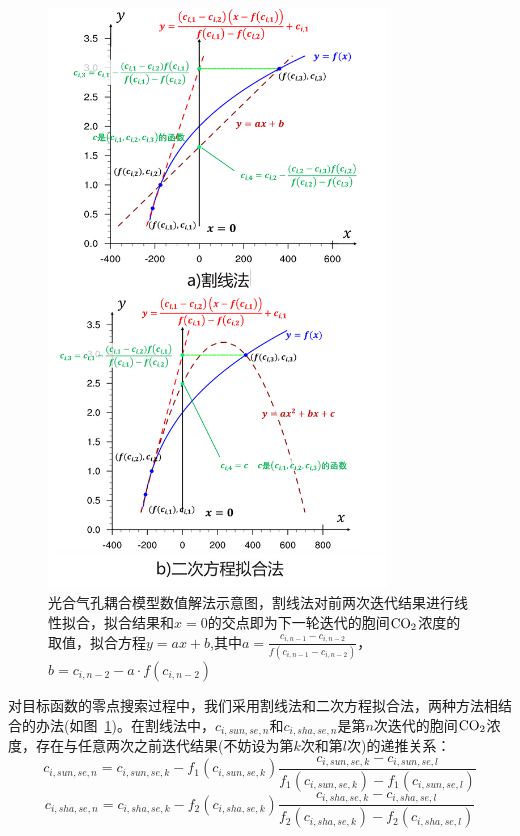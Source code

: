 {
\begin{figure}[htbp]
\centering
\includegraphics[width=0.8\textwidth]{Figures/气孔导度和光合作用/光合气孔耦合模型数值解法示意图.png}
\caption[光合气孔耦合模型数值解法示意图]{光合气孔耦合模型数值解法示意图，割线法对前两次迭代结果进行线性拟合，拟合结果和$x=0$的交点即为下一轮迭代的胞间$\rm CO_2$浓度的取值，拟合方程$y=ax+b$,其中$a=\frac{c_{i,n-1}-c_{i,n-2}}{f\left(c_{i,n-1}-c_{i,n-2}\right)}$，$b=c_{i,n-2}-a\cdot f\left(c_{i,n-2}\right)$}
\label{fig:光合气孔耦合模型数值解法示意图}
\end{figure}
}

对目标函数的零点搜索过程中，我们采用割线法和二次方程拟合法，两种方法相结合的办法(如图~\ref{fig:光合气孔耦合模型数值解法示意图})。在割线法中，$c_{i,sun,se,n}$和$c_{i,sha,se,n}$是第$n$次迭代的胞间$\rm CO_2$浓度，存在与任意两次之前迭代结果(不妨设为第$k$次和第$l$次)的递推关系：
\begin{equation}\label{cisunn}
c_{i,sun,se,n}=c_{i,sun,se,k}-f_{1}\left(c_{i,sun,se,k}\right)\frac{c_{i,sun,se,k}-c_{i,sun,se,l}}{ f_{1}\left(c_{i,sun,se,k}\right)-f_{1}\left(c_{i,sun,se,l}\right)} 
\end{equation}
\begin{equation}\label{cishan}
c_{i,sha,se,n}=c_{i,sha,se,k}-f_{2}\left(c_{i,sha,se,k}\right)\frac{c_{i,sha,se,k}-c_{i,sha,se,l}}{ f_{2}\left(c_{i,sha,se,k}\right)-f_{2}\left(c_{i,sha,se,l}\right)} 
\end{equation}

